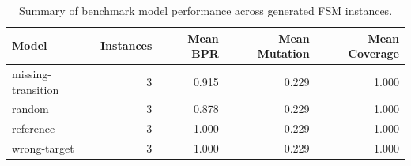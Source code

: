 \begin{table}[t]
\centering
\caption{Summary of benchmark model performance across generated FSM instances.}
\label{tab:model_summary}
\begin{tabular}{lrrrr}
\toprule
Model & Instances & Mean BPR & Mean Mutation & Mean Coverage \\
\midrule
missing-transition & 3 & 0.915 & 0.229 & 1.000 \\
random & 3 & 0.878 & 0.229 & 1.000 \\
reference & 3 & 1.000 & 0.229 & 1.000 \\
wrong-target & 3 & 1.000 & 0.229 & 1.000 \\
\bottomrule
\end{tabular}
\end{table}
